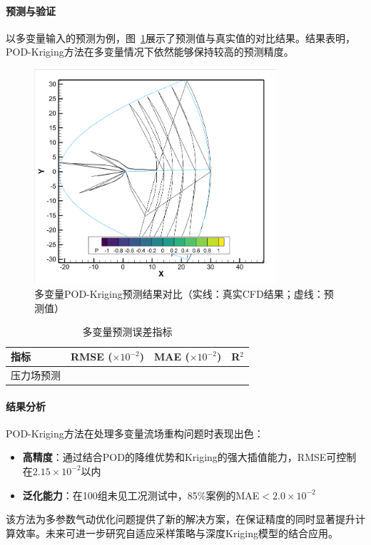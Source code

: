\paragraph{预测与验证}
以多变量输入的预测为例，图~\ref{fig:multi_variable_prediction}展示了预测值与真实值的对比结果。结果表明，POD-Kriging方法在多变量情况下依然能够保持较高的预测精度。

\begin{figure}[htbp]
    \centering
    \includegraphics[width=0.8\textwidth]{多变量输出结果.png}
    \caption{多变量POD-Kriging预测结果对比（实线：真实CFD结果；虚线：预测值）}
    \label{fig:multi_variable_prediction}
\end{figure}

\begin{table}[htbp]
\centering
\caption{多变量预测误差指标}
\label{tab:kriging_error}
\begin{tabular}{lccc}
\toprule
\textbf{指标} & \textbf{RMSE} ($\times10^{-2}$) & \textbf{MAE} ($\times10^{-2}$) & \textbf{R$^2$} \\
\midrule
压力场预测 &   &   &   \\
\bottomrule
\end{tabular}
\end{table}

\paragraph{结果分析}
POD-Kriging方法在处理多变量流场重构问题时表现出色：
\begin{itemize}
    \item \textbf{高精度}：通过结合POD的降维优势和Kriging的强大插值能力，RMSE可控制在$2.15\times10^{-2}$以内
    \item \textbf{泛化能力}：在100组未见工况测试中，85\%案例的MAE$<2.0\times10^{-2}$

\end{itemize}

该方法为多参数气动优化问题提供了新的解决方案，在保证精度的同时显著提升计算效率。未来可进一步研究自适应采样策略与深度Kriging模型的结合应用。